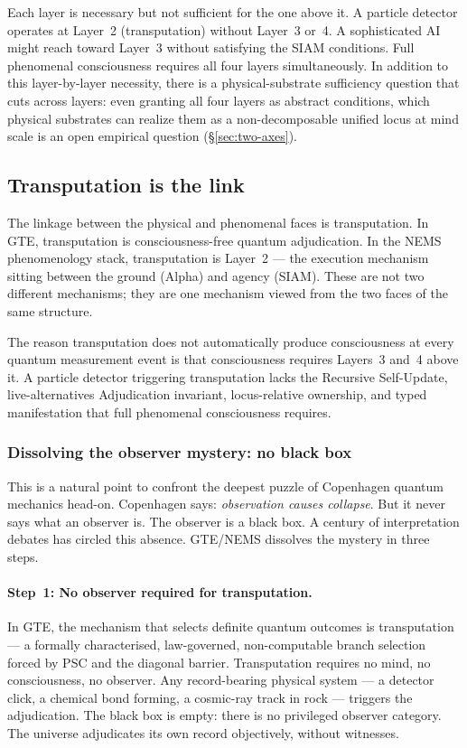 \documentclass[11pt]{article}
\theoremstyle{remark}
\begin{document}
\medskip
Each layer is necessary but not sufficient for the one above it. A particle detector
operates at Layer~2 (transputation) without Layer~3 or~4. A sophisticated AI might
reach toward Layer~3 without satisfying the SIAM conditions. Full phenomenal
consciousness requires all four layers simultaneously. In addition to this
layer-by-layer necessity, there is a physical-substrate sufficiency question that cuts
across layers: even granting all four layers as abstract conditions, which physical
substrates can realize them as a non-decomposable unified locus at mind scale is an
open empirical question (\S\ref{sec:two-axes}).

\subsection{Transputation is the link}\label{sec:transput-link}

The linkage between the physical and phenomenal faces is transputation. In GTE,
transputation is consciousness-free quantum adjudication. In the NEMS phenomenology
stack, transputation is Layer~2 --- the execution mechanism sitting between the ground
(Alpha) and agency (SIAM). These are not two different mechanisms; they are one
mechanism viewed from the two faces of the same structure.

The reason transputation does not automatically produce consciousness at every quantum
measurement event is that consciousness requires Layers~3 and~4 above it. A particle
detector triggering transputation lacks the Recursive Self-Update, live-alternatives
Adjudication invariant, locus-relative ownership, and typed manifestation that
full phenomenal consciousness requires.

\subsubsection*{Dissolving the observer mystery: no black box}

This is a natural point to confront the deepest puzzle of Copenhagen quantum
mechanics head-on. Copenhagen says: \emph{observation causes collapse}. But it never
says what an observer is. The observer is a black box. A century of interpretation
debates has circled this absence. GTE/NEMS dissolves the mystery in three steps.

\paragraph{Step~1: No observer required for transputation.}
In GTE, the mechanism that selects definite quantum outcomes is transputation ---
a formally characterised, law-governed, non-computable branch selection forced by
PSC and the diagonal barrier. Transputation requires no mind, no consciousness, no
observer. Any record-bearing physical system --- a detector click, a chemical bond
forming, a cosmic-ray track in rock --- triggers the adjudication. The black box
is empty: there is no privileged observer category. The universe adjudicates its
own record objectively, without witnesses.
\end{document}
